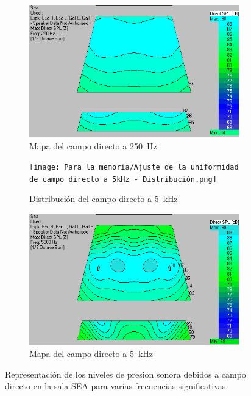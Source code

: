 \documentclass{article}
\begin{document}
\begin{figure}[H]
\begin{subfigure}[b]{0.45\linewidth}
        \label{fig:uniformidad_dist_250}
    \end{subfigure}
    \begin{subfigure}[b]{0.45\linewidth}
        \includegraphics[width=\linewidth]{Para la memoria/Ajuste de la uniformidad de campo directo a 250 Hz - Mapa.png}
        \caption{Mapa del campo directo a \qty{250}{\hertz}}
        \label{fig:uniformidad_mapa_250}
    \end{subfigure}
    \begin{subfigure}[b]{0.45\linewidth}
        \texttt{[image: Para la memoria/Ajuste de la uniformidad de campo directo a 5kHz - Distribución.png]}
        \caption{Distribución del campo directo a \qty{5}{\kilo \hertz}}
        \label{fig:uniformidad_dist_5k}
    \end{subfigure}
    \begin{subfigure}[b]{0.45\linewidth}
        \includegraphics[width=\linewidth]{Para la memoria/Ajuste de la uniformidad de campo directo a 5kHz - Mapa.png}
        \caption{Mapa del campo directo a \qty{5}{\kilo \hertz}}
        \label{fig:uniformidad_mapa_5k}
    \end{subfigure}
    \caption{Representación de los niveles de presión sonora debidos a campo directo en la sala SEA para varias frecuencias significativas.}
    \label{fig:uniformidad_campo_directo}
\end{figure}
\end{document}
